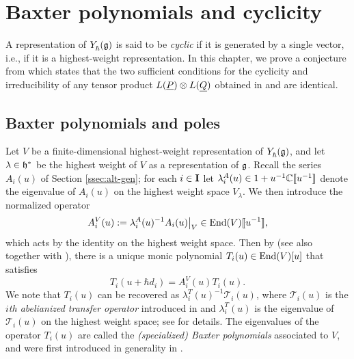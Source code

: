 \chapter{Baxter polynomials and cyclicity}

A representation of $Y_\hbar^{}(\mathfrak{g})$ is said to be \emph{cyclic} if it is generated by a single vector, i.e., if it is a highest-weight representation.
In this chapter, we prove a conjecture from \cite[\S 7.4]{gautam_poles_2023} which states that the two sufficient conditions for the cyclicity and irreducibility of any tensor product $L(\underline{P})\otimes L(\underline{Q})$ obtained in \cite{gautam_poles_2023} and \cite{tan_braid_2015} are identical.


\section{Baxter polynomials and poles}\label{sec:baxter-poles}

Let $V$ be a finite-dimensional highest-weight representation of $Y_\hbar^{}(\mathfrak{g})$, and let $\lambda\in\mathfrak{h}^*$ be the highest weight of $V$ as a representation of $\mathfrak{g}$.
Recall the series $A_i(u)$ of Section \ref{ssec:alt-gen}; for each $i\in\mathbf{I}$ let $\lambda_i^A(u)\in 1+u^{-1}\mathbb{C}[\![u^{-1}]\!]$ denote the eigenvalue of $A_i(u)$ on the highest weight space $V_\lambda$.
We then introduce the normalized operator
\[A_i^V(u) := \lambda_i^A(u)^{-1}A_i(u)\big|_V \in\operatorname{End}(V)[\![u^{-1}]\!],\]
which acts by the identity on the highest weight space.
Then by \cite[Thm. 4.4]{gautam_poles_2023} (see also \cite[Cor. 4.7]{gautam_poles_2023} together with \cite[Prop. 5.7, 5.8]{hernandez_shifted_2022}), there is a unique monic polynomial $T_i(u)\in\operatorname{End}(V)[u]$ that satisfies
\begin{equation}\label{eqn:transfer-op}
    T_i(u+\hbar d_i) = A_i^V(u)T_i(u).
\end{equation}
We note that $T_i(u)$ can be recovered as $\lambda_i^T(u)^{-1}\mathscr{T}_i(u)$, where $\mathscr{T}_i(u)$ is the \emph{$i$th abelianized transfer operator} introduced in \cite[\S 4.3]{gautam_poles_2023} and $\lambda_i^T(u)$ is the eigenvalue of $\mathscr{T}_i(u)$ on the highest weight space; see \cite[Remark 5.1]{friesen_braid_2024} for details.
The eigenvalues of the operator $T_i(u)$ are called the \emph{(specialized) Baxter polynomials} associated to $V$, and were first introduced in generality in \cite{frenkel_baxters_2015}.

